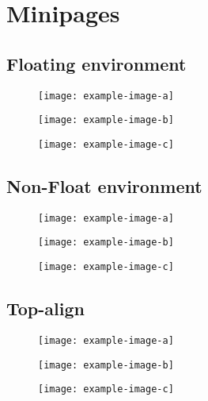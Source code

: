 \documentclass{article}
\begin{document}
	\section{Minipages}
	\subsection{Floating environment}
	\begin{figure}[h]
		\centering
		\begin{minipage}{0.3\textwidth}
			\centering
			\texttt{[image: example-image-a]}
		\end{minipage}
		\begin{minipage}{0.3\textwidth}
			\centering
			\texttt{[image: example-image-b]}
		\end{minipage}
		\begin{minipage}{0.3\textwidth}
			\centering
			\texttt{[image: example-image-c]}
		\end{minipage}
	\end{figure}
	\subsection{Non-Float environment}
	\begin{figure}[H]
		\centering
		\begin{minipage}{0.3\textwidth}
			\centering
			\texttt{[image: example-image-a]}
		\end{minipage}
		\begin{minipage}{0.3\textwidth}
			\centering
			\texttt{[image: example-image-b]}
		\end{minipage}
		\begin{minipage}{0.3\textwidth}
			\centering
			\texttt{[image: example-image-c]}
		\end{minipage}
	\end{figure}
	\subsection{Top-align}
	\begin{figure}[h]
		\centering
		\begin{minipage}[t]{0.3\textwidth}\vspace{0pt}
			\centering
			\texttt{[image: example-image-a]}
		\end{minipage}
		\begin{minipage}[t]{0.3\textwidth}\vspace{0pt}
			\centering
			\texttt{[image: example-image-b]}
		\end{minipage}
		\begin{minipage}[t]{0.3\textwidth}\vspace{0pt}
			\centering
			\texttt{[image: example-image-c]}
		\end{minipage}
	\end{figure}
\end{document}
